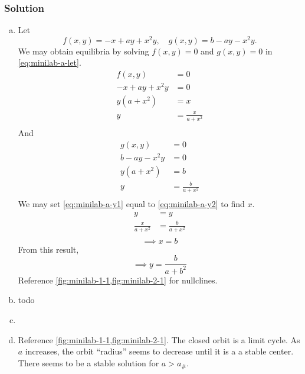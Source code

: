 \documentclass[12pt]{article}
\begin{document}
\subsubsection*{Solution}
\begin{enumerate}[(a)]
\item
  Let
  \begin{equation}
    \label{eq:minilab-a-let}
    f(x,y)=-x+ay+x^2y,\quad g(x,y)=b-ay-x^2y.
  \end{equation}
  We may obtain equilibria by solving $f(x,y)=0$ and $g(x,y)=0$ in \cref{eq:minilab-a-let}.
  \begin{equation}
    \label{eq:minilab-a-y1}
    \begin{aligned}
      f(x,y) &= 0 \\
      -x+ay+x^2y &= 0 \\
      y(a+x^2) &= x \\
      y &= \frac{x}{a+x^2} \\
    \end{aligned}
  \end{equation}
  And
  \begin{equation}
    \label{eq:minilab-a-y2}
    \begin{aligned}
      g(x,y) &= 0 \\
      b-ay-x^2y &= 0 \\
      y(a+x^2) &= b \\
      y &= \frac{b}{a+x^2} \\
    \end{aligned}
  \end{equation}
  We may set \cref{eq:minilab-a-y1} equal to \cref{eq:minilab-a-y2} to find $x$.
  \begin{equation*}
    \begin{aligned}
      y &= y \\
      \frac{x}{a+x^2} &= \frac{b}{a+x^2} \\
    \end{aligned}
  \end{equation*}
  \begin{equation*}
    \boxed{\implies x = b}
  \end{equation*}
  From this result,
  \begin{equation*}
    \boxed{
      \implies y = \frac{b}{a+b^2}
    }
  \end{equation*}
  Reference \cref{fig:minilab-1-1,fig:minilab-2-1} for nullclines.
\item todo{}
\item \todo{}
\item Reference \cref{fig:minilab-1-1,fig:minilab-2-1}. The closed orbit is a
  limit cycle. As $a$ increases, the orbit ``radius'' seems to decrease until it
  is a a stable center. There seems to be a stable solution for $a>a_{\#}$.


\end{enumerate}
\end{document}
